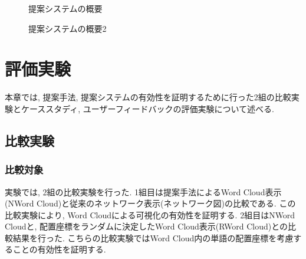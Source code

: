 \documentclass[syuuron]{kuee}
\begin{document}
		\begin{figure}
			\begin{center}
			\end{center}
			\caption{提案システムの概要}
	  		\label{fig:sys1}
		\end{figure}
		\begin{figure}
			\begin{center}
			\end{center}
			\caption{提案システムの概要2}
	  		\label{fig:sys2}
		\end{figure}

\chapter{評価実験}
	本章では, 提案手法, 提案システムの有効性を証明するために行った2組の比較実験とケーススタディ, ユーザーフィードバックの評価実験について述べる. 
	\section{比較実験}
		\subsection{比較対象}
			実験では, 2組の比較実験を行った. 
			1組目は提案手法によるWord Cloud表示(NWord Cloud)と従来のネットワーク表示(ネットワーク図)の比較である. 
			この比較実験により, Word Cloudによる可視化の有効性を証明する. 
			2組目はNWord Cloudと, 配置座標をランダムに決定したWord Cloud表示(RWord Cloud)との比較結果を行った. 
			こちらの比較実験ではWord Cloud内の単語の配置座標を考慮することの有効性を証明する. 
			
\end{document}
